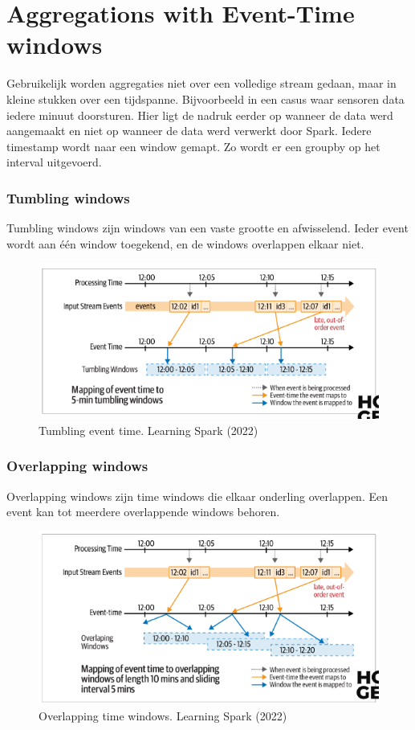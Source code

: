 \documentclass[a4paper,10pt,twoside]{report}
\begin{document}
\section{Aggregations with Event-Time windows}

Gebruikelijk worden aggregaties niet over een volledige stream gedaan, maar in kleine stukken over een tijdspanne. Bijvoorbeeld in een casus waar sensoren data iedere minuut doorsturen. Hier ligt de nadruk eerder op wanneer de data werd aangemaakt en niet op wanneer de data werd verwerkt door Spark. Iedere timestamp wordt naar een window gemapt. Zo wordt er een groupby op het interval uitgevoerd.

\subsubsection{Tumbling windows}

Tumbling windows zijn windows van een vaste grootte en afwisselend. Ieder event wordt aan één window toegekend, en de windows overlappen elkaar niet. 

\begin{figure}
\includegraphics[width=\linewidth]{images/tumbling.png}
\caption{Tumbling event time. Learning Spark (2022)}
\end{figure}

\subsubsection{Overlapping windows}

Overlapping windows zijn time windows die elkaar onderling overlappen. Een event kan tot meerdere overlappende windows behoren.

\begin{figure}
\includegraphics[width=\linewidth]{images/overlapping.png}
\caption{Overlapping time windows. Learning Spark (2022)}
\end{figure}
\end{document}
